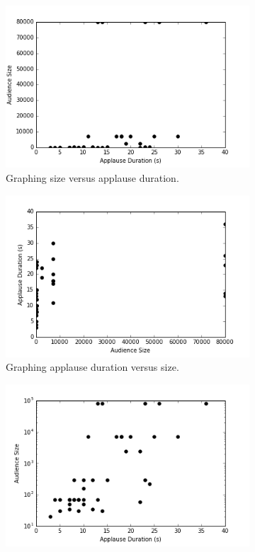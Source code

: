 \begin{figure}[h]
  \centering
  \begin{subfigure}[b]{0.4\linewidth}
    \includegraphics[width=\linewidth]{images/chapter4/1.png}
    \caption{Graphing size versus applause duration.}
  \end{subfigure}
  \begin{subfigure}[b]{0.4\linewidth}
    \includegraphics[width=\linewidth]{images/chapter4/2.png}
    \caption{Graphing applause duration versus size.}
  \end{subfigure}
    \begin{subfigure}[b]{0.4\linewidth}
    \includegraphics[width=\linewidth]{images/chapter4/3.png}

\end{subfigure}
\end{figure}
